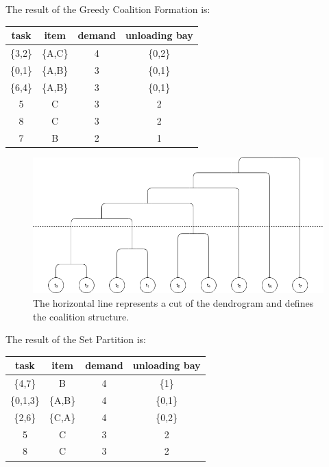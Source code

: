 The result of the Greedy Coalition Formation is:
\begin{center}
  \begin{tabular}{|c|c|c|c|} \hline
  \textbf{task} & \textbf{item} & \textbf{demand} & \textbf{unloading bay} \\ \hline
  \{3,2\}    & \{A,C\}    & 4     & \{0,2\}             \\
  \{0,1\}    & \{A,B\}    & 3     & \{0,1\}             \\
  \{6,4\}    & \{A,B\}    & 3     & \{0,1\}             \\
  5    & C    & 3      & 2             \\
  8    & C    & 3      & 2             \\        
  7    & B    & 2      & 1             \\\hline
  \end{tabular}
\end{center}

\begin{figure} [hbt]
    \centering
    \includegraphics[width=\textwidth]{img/CF.png}
    \caption{The horizontal line represents a cut of the dendrogram
    and defines the coalition structure.}
    \label{fig:CF_graph}
\end{figure}

The result of the Set Partition is:

  \begin{center}
    \begin{tabular}{|c|c|c|c|} \hline
    \textbf{task} & \textbf{item} & \textbf{demand} & \textbf{unloading bay} \\ \hline
    \{4,7\}    & B    & 4     & \{1\}             \\
    \{0,1,3\}  & \{A,B\}& 4    & \{0,1\}             \\
    \{2,6\}    & \{C,A\}    & 4  & \{0,2\}             \\
    5    & C    & 3      & 2             \\
    8    & C    & 3      & 2             \\ \hline       
    \end{tabular}
  \end{center}

